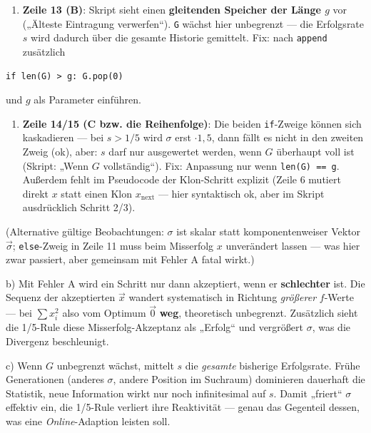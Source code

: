 \documentclass[11pt, a4paper]{article}
\begin{document}
\begin{enumerate}
  \item \textbf{Zeile 13 (B)}: Skript sieht einen \textbf{gleitenden Speicher der Länge $g$} vor („Älteste Eintragung verwerfen“). \texttt{G} wächst hier unbegrenzt — die Erfolgsrate $s$ wird dadurch über die gesamte Historie gemittelt. Fix: nach \texttt{append} zusätzlich
\end{enumerate}
\begin{lstlisting}
if len(G) > g: G.pop(0)
\end{lstlisting}

und $g$ als Parameter einführen.


\begin{enumerate}
  \item \textbf{Zeile 14/15 (C bzw. die Reihenfolge)}: Die beiden \texttt{if}-Zweige können sich kaskadieren — bei $s > 1/5$ wird $\sigma$ erst $\cdot 1{,}5$, dann fällt es nicht in den zweiten Zweig (ok), aber: $s$ darf nur ausgewertet werden, wenn $G$ überhaupt voll ist (Skript: „Wenn $G$ vollständig“). Fix: Anpassung nur wenn \texttt{len(G) == g}. Außerdem fehlt im Pseudocode der Klon-Schritt explizit (Zeile 6 mutiert direkt $x$ statt einen Klon $x_{\text{next}}$ — hier syntaktisch ok, aber im Skript ausdrücklich Schritt 2/3).
\end{enumerate}

(Alternative gültige Beobachtungen: $\sigma$ ist skalar statt komponentenweiser Vektor $\vec\sigma$; \texttt{else}-Zweig in Zeile 11 muss beim Misserfolg $x$ unverändert lassen — was hier zwar passiert, aber gemeinsam mit Fehler A fatal wirkt.)


b) Mit Fehler A wird ein Schritt nur dann akzeptiert, wenn er \textbf{schlechter} ist. Die Sequenz der akzeptierten $\vec x$ wandert systematisch in Richtung \textit{größerer} $f$-Werte — bei $\sum x_i^2$ also vom Optimum $\vec 0$ \textbf{weg}, theoretisch unbegrenzt. Zusätzlich sieht die 1/5-Rule diese Misserfolg-Akzeptanz als „Erfolg“ und vergrößert $\sigma$, was die Divergenz beschleunigt.


c) Wenn $G$ unbegrenzt wächst, mittelt $s$ die \textit{gesamte} bisherige Erfolgsrate. Frühe Generationen (anderes $\sigma$, andere Position im Suchraum) dominieren dauerhaft die Statistik, neue Information wirkt nur noch infinitesimal auf $s$. Damit „friert“ $\sigma$ effektiv ein, die 1/5-Rule verliert ihre Reaktivität — genau das Gegenteil dessen, was eine \textit{Online}-Adaption leisten soll.
\end{document}

